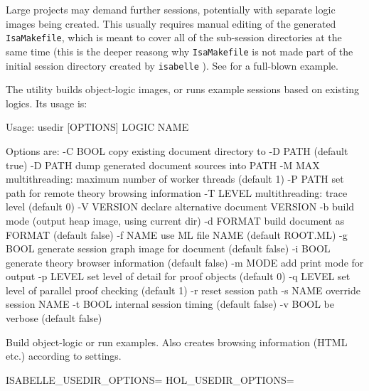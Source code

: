 \begin{isabellebody}
\begin{isamarkuptext}
  \medskip Large projects may demand further sessions, potentially
  with separate logic images being created.  This usually requires
  manual editing of the generated \verb|IsaMakefile|, which is
  meant to cover all of the sub-session directories at the same time
  (this is the deeper reasong why \verb|IsaMakefile| is not made
  part of the initial session directory created by \verb|isabelle| \hyperlink{tool.mkdir}{\mbox{}}).  See \hyperlink{file.~~/src/HOL/IsaMakefile}{\mbox{}} for
  a full-blown example.%
\end{isamarkuptext}%
\isamarkuptrue%
%
\isamarkuptrue%
%
\begin{isamarkuptext}%
The \hypertarget{tool.usedir}{\hyperlink{tool.usedir}{\mbox{}}} utility builds object-logic images, or runs
  example sessions based on existing logics. Its usage is:
\begin{ttbox}

Usage: usedir [OPTIONS] LOGIC NAME

  Options are:
    -C BOOL      copy existing document directory to -D PATH (default true)
    -D PATH      dump generated document sources into PATH
    -M MAX       multithreading: maximum number of worker threads (default 1)
    -P PATH      set path for remote theory browsing information
    -T LEVEL     multithreading: trace level (default 0)
    -V VERSION   declare alternative document VERSION
    -b           build mode (output heap image, using current dir)
    -d FORMAT    build document as FORMAT (default false)
    -f NAME      use ML file NAME (default ROOT.ML)
    -g BOOL      generate session graph image for document (default false)
    -i BOOL      generate theory browser information (default false)
    -m MODE      add print mode for output
    -p LEVEL     set level of detail for proof objects (default 0)
    -q LEVEL     set level of parallel proof checking (default 1)
    -r           reset session path
    -s NAME      override session NAME
    -t BOOL      internal session timing (default false)
    -v BOOL      be verbose (default false)

  Build object-logic or run examples. Also creates browsing
  information (HTML etc.) according to settings.

  ISABELLE_USEDIR_OPTIONS=
  HOL_USEDIR_OPTIONS=


\end{ttbox}
\end{isamarkuptext}
\end{isabellebody}
